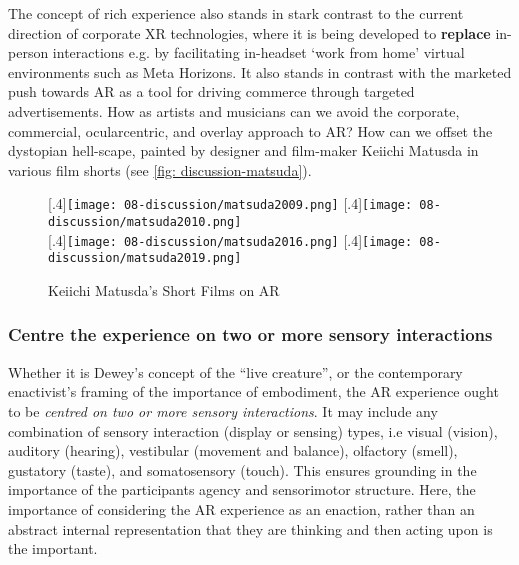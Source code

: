 The concept of rich experience also stands in stark contrast to the current direction of corporate XR technologies, where it is being developed to \textbf{replace} in-person interactions e.g. by facilitating in-headset `work from home' virtual environments such as Meta Horizons. It also stands in contrast with the marketed push towards AR as a tool for driving commerce through targeted advertisements. How as artists and musicians can we avoid the corporate, commercial, ocularcentric, and overlay approach to AR? How can we offset the dystopian hell-scape, painted by designer and film-maker Keiichi Matusda in various film shorts (see \autoref{fig: discussion-matsuda}).

\begin{figure}
    \centering
    [.4\linewidth]{\texttt{[image: 08-discussion/matsuda2009.png]}}
    [.4\linewidth]{\texttt{[image: 08-discussion/matsuda2010.png]}} \\
    \vspace{0.5cm}
    [.4\linewidth]{\texttt{[image: 08-discussion/matsuda2016.png]}}
    [.4\linewidth]{\texttt{[image: 08-discussion/matsuda2019.png]}}
    \caption{Keiichi Matusda's Short Films on AR}
    \label{fig: discussion-matsuda}
\end{figure}

\subsubsection{Centre the experience on two or more sensory interactions}
Whether it is Dewey's concept of the ``live creature'', or the contemporary enactivist's framing of the importance of embodiment, the AR experience ought to be \textit{centred on two or more sensory interactions}. It may include any combination of sensory interaction (display or sensing) types, i.e visual (vision), auditory (hearing), vestibular (movement and balance), olfactory (smell), gustatory (taste), and somatosensory (touch). This ensures grounding in the importance of the participants agency and sensorimotor structure. Here, the importance of considering the AR experience as an enaction, rather than an abstract internal representation that they are thinking and then acting upon is the important.

